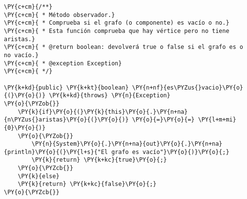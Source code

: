 \begin{Verbatim}[commandchars=\\\{\}]
\PY{c+cm}{/**}
\PY{c+cm}{ * Método observador.}
\PY{c+cm}{ * Comprueba si el grafo (o componente) es vacío o no.}
\PY{c+cm}{ * Esta función comprueba que hay vértice pero no tiene aristas.}
\PY{c+cm}{ * @return boolean: devolverá true o false si el grafo es o no vacío.}
\PY{c+cm}{ * @exception Exception}
\PY{c+cm}{ */}

\PY{k+kd}{public} \PY{k+kt}{boolean} \PY{n+nf}{es\PYZus{}vacio}\PY{o}{(}\PY{o}{)} \PY{k+kd}{throws} \PY{n}{Exception}
\PY{o}{\PYZob{}}
    \PY{k}{if}\PY{o}{(}\PY{k}{this}\PY{o}{.}\PY{n+na}{n\PYZus{}aristas}\PY{o}{(}\PY{o}{)} \PY{o}{=}\PY{o}{=} \PY{l+m+mi}{0}\PY{o}{)}
	\PY{o}{\PYZob{}}
	    \PY{n}{System}\PY{o}{.}\PY{n+na}{out}\PY{o}{.}\PY{n+na}{println}\PY{o}{(}\PY{l+s}{"El grafo es vacío"}\PY{o}{)}\PY{o}{;}
	    \PY{k}{return} \PY{k+kc}{true}\PY{o}{;}
	\PY{o}{\PYZcb{}}
    \PY{k}{else}
	\PY{k}{return} \PY{k+kc}{false}\PY{o}{;}
\PY{o}{\PYZcb{}}
\end{Verbatim}
